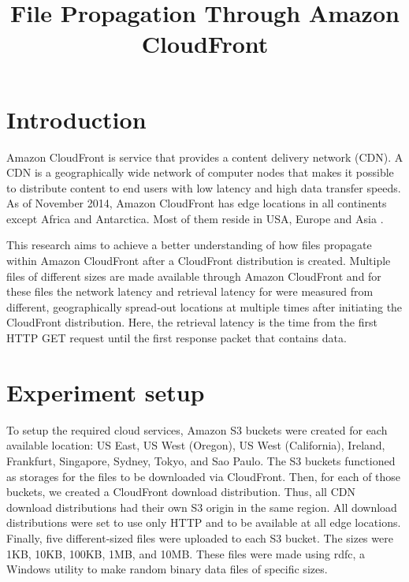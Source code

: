 \documentclass[conference]{IEEEtran}
\begin{document}
%
\title{File Propagation Through Amazon CloudFront}


\author{
\and
{}
}


\maketitle

\IEEEpeerreviewmaketitle



\section{Introduction}
Amazon CloudFront is service that provides a content delivery network (CDN). A CDN is a geographically wide network of computer nodes that makes it possible to distribute content to end users with low latency and high data transfer speeds. As of November 2014, Amazon CloudFront has edge locations in all continents except Africa and Antarctica. Most of them reside in USA, Europe and Asia \cite{CloudFront_product_details}.

This research aims to achieve a better understanding of how files propagate within Amazon CloudFront after a CloudFront distribution is created.  Multiple files of different sizes are made available through Amazon CloudFront and for these files the network latency and retrieval latency for were measured from different, geographically spread-out locations at multiple times after initiating the CloudFront distribution. Here, the retrieval latency is the time from the first HTTP GET request until the first response packet that contains data.

\section{Experiment setup}
To setup the required cloud services, Amazon S3 buckets were created for each available location: US East, US West (Oregon), US West (California), Ireland, Frankfurt, Singapore, Sydney, Tokyo, and Sao Paulo. The S3 buckets functioned as storages for the files to be downloaded via CloudFront. Then, for each of those buckets, we created a CloudFront download distribution. Thus, all CDN download distributions had their own S3 origin in the same region. All download distributions were set to use only HTTP and to be available at all edge locations. Finally, five different-sized files were uploaded to each S3 bucket. The sizes were 1KB, 10KB, 100KB, 1MB, and 10MB. These files were made using rdfc, a Windows utility to make random binary data files of specific sizes.
\end{document}
